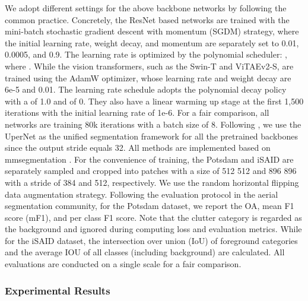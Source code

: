 \documentclass[10pt, journal,twoside]{IEEEtran}
\begin{document}
We adopt different settings for the above backbone networks by following the common practice. Concretely, the ResNet based networks are trained with the mini-batch stochastic gradient descent with momentum (SGDM) strategy, where the initial learning rate, weight decay, and momentum are separately set to 0.01, 0.0005, and 0.9. The learning rate is optimized by the polynomial scheduler: , where . While the vision transformers, such as the Swin-T and ViTAEv2-S, are trained using the AdamW optimizer, whose learning rate and weight decay are 6e-5 and 0.01. The learning rate schedule adopts the polynomial decay policy with a  of 1.0 and  of 0. They also have a linear warming up stage at the first 1,500 iterations with the initial learning rate of 1e-6. For a fair comparison, all networks are training 80k iterations with a batch size of 8. Following \cite{swint,xu2021vitae}, we use the UperNet \cite{upernet} as the unified segmentation framework for all the pretrained backbones since the output stride equals 32. All methods are implemented based on mmsegmentation \cite{mmseg2020}. For the convenience of training, the Potsdam and iSAID are separately sampled and cropped into patches with a size of 512  512 and 896  896 with a stride of 384 and 512, respectively. We use the random horizontal flipping data augmentation strategy. Following the evaluation protocol in the aerial segmentation community, for the Potsdam dataset, we report the OA, mean F1 score (mF1), and per class F1 score. Note that the clutter category is regarded as the background and ignored during computing loss and evaluation metrics. While for the iSAID dataset, the intersection over union (IoU) of foreground categories and the average IOU of all classes (including background) are calculated. All evaluations are conducted on a single scale for a fair comparison. 

\subsubsection{Experimental Results}
\end{document}
